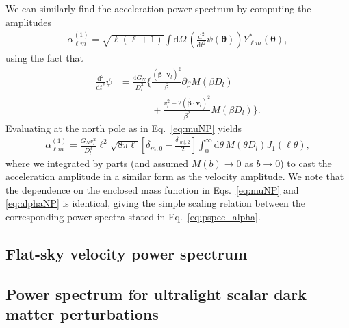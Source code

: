 \documentclass[twocolumn]{aastex63}
\newcommand{\vect}[1]{\boldsymbol{\mathbf{#1}}}
\newcommand{\dd}{\mathrm{d}}
\newcommand{\ellm}{{\ell m}}
\begin{document}
We can similarly find the acceleration power spectrum by computing the amplitudes
\begin{align}
\alpha_{\ell m}^{(1)} = \sqrt{\ell(\ell+1)}\int \dd\Omega\, \left(\frac{\dd^2}{\dd t^2} \psi(\vect{\theta})\right) Y_{\ellm}^*(\vect{\theta}), \label{eq:alphaperlens1}
\end{align}
using the fact that
\begin{align}
\frac{\dd^2}{\dd t^2} \psi &= \frac{4G_N}{D_l^3} \bigg\lbrace\frac{(\hat{\vect{\beta}} \cdot {\vect{v}}_l)^2}{\beta}  \partial_\beta M(\beta D_l) \\
&\phantom{=\frac{4G_N}{D_l^3} \bigg\lbrace} + \frac{v_l^2 - 2 (\hat{\vect{\beta}} \cdot {\vect{v}}_l)^2 }{\beta^2}M(\beta D_l)\bigg\rbrace. \nonumber
\end{align}
Evaluating at the north pole as in Eq.~\ref{eq:muNP} yields
\begin{align}
\alpha_{\ell m}^{(1)}  = \frac{G_N v_l^2}{D_l^3} \ell^2 \sqrt{8\pi \ell}\left[\delta_{m,0}-\frac{\delta_{|m|,2}}{2} \right]\int_0^\infty \dd \theta \, M(\theta D_l) J_1(\ell \theta),\label{eq:alphaNP}
\end{align}
where we integrated by parts (and assumed $M(b)\to 0$ as $b\to 0$) to cast the acceleration amplitude in a similar form as the velocity amplitude. We note that the dependence on the enclosed mass function in Eqs.~\ref{eq:muNP} and \ref{eq:alphaNP} is identical, giving the simple scaling relation between the corresponding power spectra stated in Eq.~\ref{eq:pspec_alpha}.

\subsection{Flat-sky velocity power spectrum}

\subsection{Power spectrum for ultralight scalar dark matter perturbations}
\end{document}
